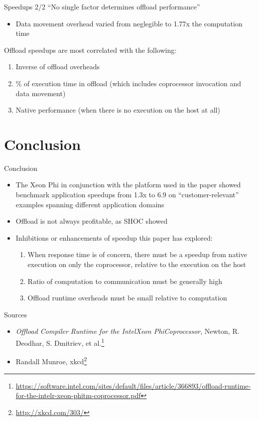 \documentclass[screen]{beamer}
\begin{document}
\begin{frame}{Speedups 2/2}
    ``No single factor determines offload performance''
    \begin{itemize}[<+-| alert@+>]
        \item Data movement overhead varied from neglegible to 1.77x the computation time
    \end{itemize}
    Offload speedups are most correlated with the following:
    \begin{enumerate}[<+-| alert@+>]
        \item Inverse of offload overheads
        \item \% of execution time in offload (which includes coprocessor invocation and data movement)
        \item Native performance (when there is no execution on the host at all)
    \end{enumerate}
\end{frame}

\section{Conclusion}

\begin{frame}{Conclusion}
    \begin{itemize}
        \item The Xeon Phi in conjunction with the platform used in the paper showed benchmark application speedups from 1.3x to 6.9 on ``customer-relevant'' examples spanning different application domains
        \item Offload is not always profitable, as SHOC showed
        \item Inhibitions or enhancements of speedup this paper has explored:
        \begin{enumerate}
            \item When response time is of concern, there must be a speedup from native execution on only the coprocessor, relative to the execution on the host
            \item Ratio of computation to communication must be generally high
            \item Offload runtime overheads must be small relative to computation
        \end{enumerate}
    \end{itemize}
\end{frame}

\begin{frame}{Sources}
    \begin{itemize}
        \item \textit{Offload Compiler Runtime for the Intel\circledR  Xeon Phi\texttrademark  Coprocessor}, Newton, R.
Deodhar, S. Dmitriev, et al.\footnote{\url{https://software.intel.com/sites/default/files/article/366893/offload-runtime-for-the-intelr-xeon-phitm-coprocessor.pdf}}
        \item Randall Munroe, xkcd\footnote{\url{http://xkcd.com/303/}}
    \end{itemize}
\end{frame}
\end{document}

